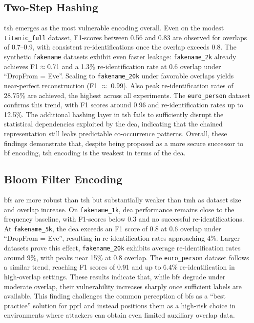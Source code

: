 \documentclass[a4paper,11pt]{scrartcl}
\begin{document}
\subsection{Two-Step Hashing}
\ac{tsh} emerges as the most vulnerable encoding overall. 
Even on the modest \texttt{titanic\_full} dataset, F1-scores between 0.56 and 0.83 are observed for overlaps of 0.7–0.9, with consistent re-identifications once the overlap exceeds 0.8. 
The synthetic \texttt{fakename} datasets exhibit even faster leakage: \texttt{fakename\_2k} already achieves F1$\approx$0.71 and a 1.3\% re-identification rate at 0.6 overlap under ``DropFrom = Eve''. 
Scaling to \texttt{fakename\_20k} under favorable overlaps yields near-perfect reconstruction (F1 $\approx$ 0.99). Also peak re-identification rates of 28.75\% are achieved, the highest across all experiments. 
The \texttt{euro\_person} dataset confirms this trend, with F1 scores around 0.96 and re-identification rates up to 12.5\%. 
The additional hashing layer in \ac{tsh} fails to sufficiently disrupt the statistical dependencies exploited by the \ac{dea}, indicating that the chained representation still leaks predictable co-occurrence patterns. 
Overall, these findings demonstrate that, despite being proposed as a more secure successor to \ac{bf} encoding, \ac{tsh} encoding is the weakest in terms of the \ac{dea}.

\subsection{Bloom Filter Encoding}

\ac{bf}s are more robust than \ac{tsh} but substantially weaker than \ac{tmh} as dataset size and overlap increase.
On \texttt{fakename\_1k}, \ac{dea} performance remains close to the frequency baseline, with F1-scores below 0.3 and no successful re-identifications. 
At \texttt{fakename\_5k}, the \ac{dea} exceeds an F1 score of 0.8 at 0.6 overlap under ``DropFrom = Eve'', resulting in re-identification rates approaching 4\%.
Larger datasets prove this effect, \texttt{fakename\_20k} exhibits average re-identification rates around 9\%, with peaks near 15\% at 0.8 overlap. 
The \texttt{euro\_person} dataset follows a similar trend, reaching F1 scores of 0.91 and up to 6.4\% re-identification in high-overlap settings. 
These results indicate that, while \ac{bf}s degrade under moderate overlap, their vulnerability increases sharply once sufficient labels are available. 
This finding challenges the common perception of \ac{bf}s as a ``best practice'' solution for \ac{pprl} and instead positions them as a high-risk choice in environments where attackers can obtain even limited auxiliary overlap data.
\end{document}
